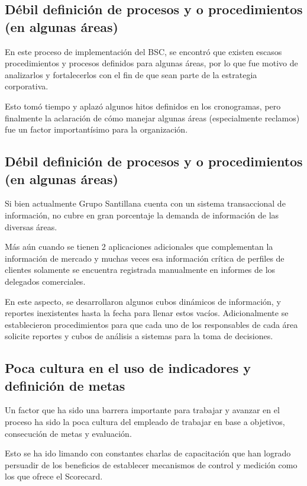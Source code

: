 \subsection{Débil definición de procesos y o procedimientos (en algunas áreas)}
\item {En este proceso de implementación del BSC, se encontró que existen escasos procedimientos y procesos definidos para algunas áreas, por lo que fue motivo de analizarlos y fortalecerlos con el fin de que sean parte de la estrategia corporativa.

Esto tomó tiempo y aplazó algunos hitos definidos en los cronogramas, pero finalmente la aclaración de cómo manejar algunas áreas (especialmente reclamos) fue un factor importantísimo para la organización.}

\subsection{Débil definición de procesos y o procedimientos (en algunas áreas)}
\item {Si bien actualmente Grupo Santillana cuenta con un sistema transaccional de información, no cubre en gran porcentaje la demanda de información de las diversas áreas.

Más aún cuando se tienen 2 aplicaciones adicionales que complementan la información de mercado y muchas veces esa información crítica de perfiles de clientes solamente se encuentra registrada manualmente en informes de los delegados comerciales.

En este aspecto, se desarrollaron algunos cubos dinámicos de información, y reportes inexistentes hasta la fecha para llenar estos vacíos. Adicionalmente se establecieron procedimientos para que cada uno de los responsables de cada área solicite reportes y cubos de análisis a sistemas para la toma de decisiones.}


\subsection{Poca cultura en el uso de indicadores y definición de metas}
\item {Un factor que ha sido una barrera importante para trabajar y avanzar en el proceso ha sido la poca cultura del empleado de trabajar en base a objetivos, consecución de metas y evaluación.

Esto se ha ido limando con constantes charlas de capacitación que han logrado persuadir de los beneficios de establecer mecanismos de control y medición como los que ofrece el Scorecard.}

